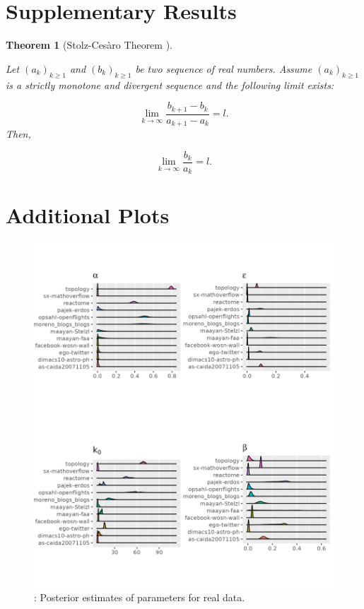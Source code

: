 \documentclass[
  sn-basic,
]{sn-jnl}
\theoremstyle{plain}
\newtheorem{theorem}{Theorem}[section]
\theoremstyle{plain}
\theoremstyle{remark}
\begin{document}
\setcounter{section}{0}
\renewcommand{\thesection}{\Alph{section}}
\setcounter{table}{0}
\renewcommand{\thetable}{A\arabic{table}}
\setcounter{figure}{0}
\renewcommand{\thefigure}{A\arabic{figure}}

\newpage

\section{Supplementary Results}\label{sec-sup}

\begin{theorem}[Stolz-Cesàro Theorem
\citep{cesaro}]\protect\hypertarget{thm-stolz}{}\label{thm-stolz}

Let \((a_k)_{k\ge1}\) and \((b_k)_{k\ge1}\) be two sequence of real
numbers. Assume \((a_k)_{k\ge1}\) is a strictly monotone and divergent
sequence and the following limit exists:

\[
\lim_{k\rightarrow\infty}\frac{b_{k+1} - b_k}{a_{k+1} - a_k} = l.
\] Then,

\[
\lim_{k\rightarrow\infty}\frac{b_k}{a_k} = l.
\]

\end{theorem}

\section{Additional Plots}\label{additional-plots}

\begin{figure}[H]

{\centering \includegraphics[width=0.8\linewidth,height=\textheight,keepaspectratio]{images/pars_plot.png}

}

\caption{: Posterior estimates of parameters for real data.}

\end{figure}%
\end{document}
